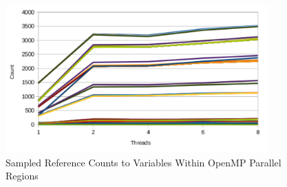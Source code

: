 \begin{figure}
\begin{center}
\includegraphics[width=0.9\textwidth]{images/cp2k-omp-inc-full.pdf}
\end{center}
\caption{Sampled Reference Counts to Variables Within OpenMP Parallel Regions}
\label{fig:openmp-refcount}
\end{figure}
